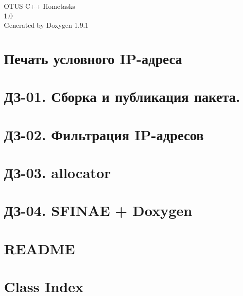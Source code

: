 \let\mypdfximage\pdfximage\def\pdfximage{\immediate\mypdfximage}\documentclass[twoside]{book}
\newcommand{\+}{\discretionary{\mbox{\scriptsize$\hookleftarrow$}}{}{}}
\newcommand{\clearemptydoublepage}{%
  \newpage{\pagestyle{empty}\cleardoublepage}%
}
\begin{document}
\raggedbottom

\hypersetup{pageanchor=false,
             bookmarksnumbered=true,
             pdfencoding=unicode
            }
\begin{titlepage}
\vspace*{7cm}
\begin{center}%
{\Large OTUS C++ Hometasks \\[1ex]\large 1.\+0 }\\
\vspace*{1cm}
{\large Generated by Doxygen 1.9.1}\\
\end{center}
\end{titlepage}
\clearemptydoublepage
{}
\tableofcontents
\clearemptydoublepage
{}
\hypersetup{pageanchor=true}

\chapter{Печать условного IP-\/адреса}
\label{index}\hypertarget{index}{}
\chapter{ДЗ-\/01. Сборка и публикация пакета.}
\label{md_01_task_task}

\chapter{ДЗ-\/02. Фильтрация IP-\/адресов}
\label{md_02_task_task}

\chapter{ДЗ-\/03. allocator}
\label{md_03_task_task}

\chapter{ДЗ-\/04. SFINAE + Doxygen}
\label{md_04_task_task}

\chapter{README}
\label{md_README}

\chapter{Class Index}

\end{document}
